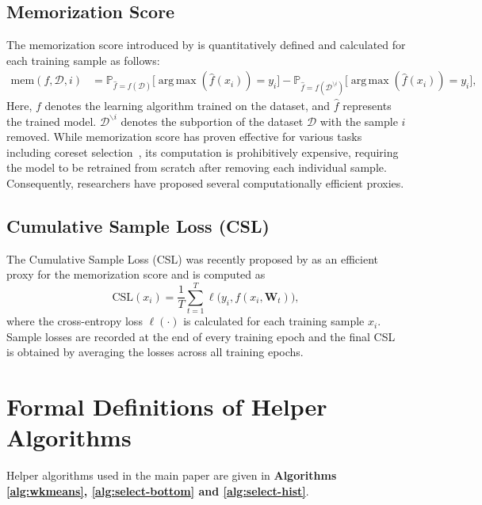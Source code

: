 \documentclass[letter,11pt]{article}
\DeclareMathOperator*{\argmax}{arg\,max}
\begin{document}
\subsection{Memorization Score}
The memorization score introduced by \cite{Memorization} is quantitatively defined and calculated for each training sample as follows:
\begin{equation}
\begin{split}
    \text{mem}(f, \mathcal{D}, i) &= \mathbb{P}_{\hat{f} = f(\mathcal{D})} \big[ \argmax(\hat{f}(x_i)) = y_i\big]
     - \mathbb{P}_{\hat{f} = f(\mathcal{D}^{\setminus i})} \big[\argmax(\hat{f}(x_i)) = y_i\big],
\end{split}
\end{equation}
Here, $f$ denotes the learning algorithm trained on the dataset, and $\hat{f}$ represents the trained model. $\mathcal{D}^{\backslash i}$ denotes the subportion of the dataset $\mathcal{D}$ with the sample $i$ removed. While memorization score has proven effective for various tasks including coreset selection~\citep{SelfSup}, its computation is prohibitively expensive, requiring the model to be retrained from scratch after removing each individual sample. Consequently, researchers have proposed several computationally efficient proxies.

\subsection{Cumulative Sample Loss (CSL)}
The Cumulative Sample Loss (CSL) was recently proposed by \cite{CSL} as an efficient proxy for the memorization score and is computed as
\begin{equation}
\text{CSL}(x_i) = \frac{1}{T}\sum_{t=1}^{T}\ell\big(y_i,f(x_i,\mathbf{W}_t)\big),
\end{equation}
where the cross-entropy loss $\ell(\cdot)$ is calculated for each training sample $x_i$. Sample losses are recorded at the end of every training epoch and the final CSL is obtained by averaging the losses across all training epochs.
\section{Formal Definitions of Helper Algorithms}\label{sec:app_helper_algs}

Helper algorithms used in the main paper are given in \textbf{Algorithms \ref{alg:wkmeans}, \ref{alg:select-bottom} and \ref{alg:select-hist}}.
\end{document}
